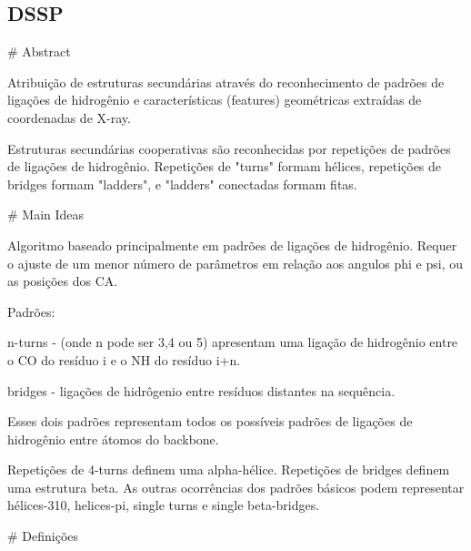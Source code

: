 \subsection{DSSP}

# Abstract

Atribuição de estruturas secundárias através do reconhecimento de padrões de ligações de hidrogênio e características (features) geométricas extraídas de coordenadas de X-ray.

Estruturas secundárias cooperativas são reconhecidas por repetições  de padrões de ligações de hidrogênio. Repetições de "turns" formam hélices, repetições de bridges formam "ladders", e "ladders" conectadas formam fitas.

# Main Ideas

Algoritmo baseado principalmente em padrões de ligações de hidrogênio. Requer o ajuste de um menor número de parâmetros em relação aos angulos phi e psi, ou as posições dos CA.

Padrões:

n-turns - (onde n pode ser 3,4 ou 5) apresentam uma ligação de hidrogênio entre o CO do resíduo i e o NH do resíduo i+n.

bridges - ligações de hidrôgenio entre resíduos distantes na sequência.

Esses dois padrões representam todos os possíveis padrões de ligações de hidrogênio entre átomos do backbone.

Repetições de 4-turns definem uma alpha-hélice. Repetições de bridges definem uma estrutura beta. As outras ocorrências dos padrões básicos podem representar hélices-310, helices-pi, single turns e single beta-bridges.

# Definições





